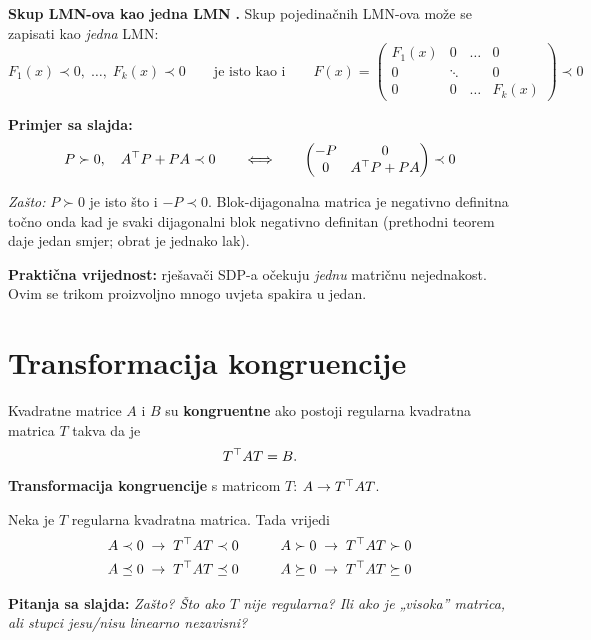 \textbf{Skup LMN-ova kao jedna LMN} \textbf{.} Skup pojedinačnih
LMN-ova može se zapisati kao \emph{jedna} LMN:
\[
F_1(x) \prec 0,\; \dots,\; F_k(x) \prec 0
\qquad\text{je isto kao i}\qquad
F(x) = \begin{pmatrix}
F_1(x) & 0 & \dots & 0 \\
0 & \ddots & & 0 \\
0 & 0 & \dots & F_k(x)
\end{pmatrix} \prec 0
\]

\textbf{Primjer sa slajda:}
\[
P \succ 0, \quad A^{\top} P + PA \prec 0
\qquad\Longleftrightarrow\qquad
\begin{pmatrix} -P & 0 \\ 0 & A^{\top} P + PA \end{pmatrix} \prec 0
\]

\emph{Zašto:} $P \succ 0$ je isto što i $-P \prec 0$. Blok-dijagonalna matrica
je negativno definitna točno onda kad je svaki dijagonalni blok negativno
definitan (prethodni teorem daje jedan smjer; obrat je jednako lak).

\textbf{Praktična vrijednost:} rješavači SDP-a očekuju \emph{jednu} matričnu
nejednakost. Ovim se trikom proizvoljno mnogo uvjeta spakira u jedan.

\section{Transformacija kongruencije}
\label{sec:kongruencija}

\begin{definicija}[Kongruencija]
Kvadratne matrice $A$ i $B$ su \textbf{kongruentne} ako postoji regularna
kvadratna matrica $T$ takva da je
\[
T^{\top} AT = B.
\]
\textbf{Transformacija kongruencije} s matricom $T$: $A \to T^{\top} AT$.
\end{definicija}

\begin{teorem}
Neka je $T$ regularna kvadratna matrica. Tada vrijedi
\[
\begin{aligned}
A \prec 0 &\;\to\; T^{\top} AT \prec 0 &\qquad
A \succ 0 &\;\to\; T^{\top} AT \succ 0 \\
A \preceq 0 &\;\to\; T^{\top} AT \preceq 0 &\qquad
A \succeq 0 &\;\to\; T^{\top} AT \succeq 0
\end{aligned}
\]
\end{teorem}

\textbf{Pitanja sa slajda:} \emph{Zašto? Što ako $T$ nije regularna? Ili ako je
„visoka” matrica, ali stupci jesu/nisu linearno nezavisni?}

